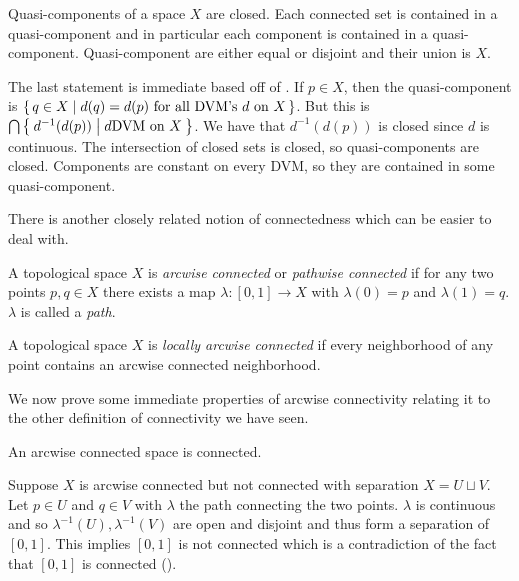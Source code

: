 \documentclass[letterpaper, 11pt, oneside]{book}
\begin{document}
\clearpage

\begin{prop}
  Quasi-components of a space $X$ are closed.
  Each connected set is contained in a quasi-component and in particular each component is contained in a quasi-component.
  Quasi-component are either equal or disjoint and their union is $X$.
\end{prop}
\begin{pf}
  The last statement is immediate based off of .
  If $p \in X$, then the quasi-component is $\set{q \in X | d(q) = d(p) \text{ for all DVM's } d \text{ on } X}$.
  But this is $\bigcap \Set{d^{-1}(d(p)) | d \text{DVM on } X}$.
  We have that $d^{-1}(d(p))$ is closed since $d$ is continuous.
  The intersection of closed sets is closed, so quasi-components are closed.
  Components are constant on every DVM, so they are contained in some quasi-component.
\end{pf}

There is another closely related notion of connectedness which can be easier to deal with.

\begin{defn}
  A topological space $X$ is \emph{arcwise connected} or \emph{pathwise connected} if for any two points $p,q \in X$ there exists a map $\lambda\colon [0, 1] \to X$ with $\lambda(0) = p$ and $\lambda(1) = q$.
  $\lambda$ is called a \emph{path}.
\end{defn}

\begin{defn}
  A topological space $X$ is \emph{locally arcwise connected} if every neighborhood of any point contains an arcwise connected neighborhood.
\end{defn}

We now prove some immediate properties of arcwise connectivity relating it to the other definition of connectivity we have seen.

\begin{prop}
  An arcwise connected space is connected.
\end{prop}
\begin{pf}
  Suppose $X$ is arcwise connected but not connected with separation $X = U \sqcup V$.
  Let $p \in U$ and $q \in V$ with $\lambda$ the path connecting the two points.
  $\lambda$ is continuous and so $\lambda^{-1}(U), \lambda^{-1}(V)$ are open and disjoint and thus form a separation of $[0, 1]$.
  This implies $[0, 1]$ is not connected which is a contradiction of the fact that $[0, 1]$ is connected ().
\end{pf}
\end{document}

